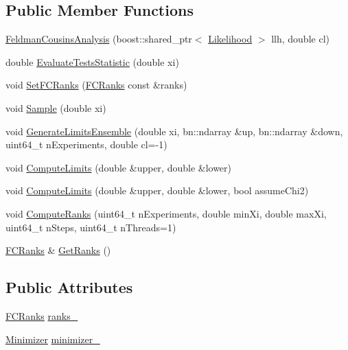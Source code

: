 \subsection*{Public Member Functions}
\begin{DoxyCompactItemize}
\item 
\hyperlink{classFeldmanCousinsAnalysis_a5b2fbad9a24678ba86f0f5b082a5b726}{Feldman\-Cousins\-Analysis} (boost\-::shared\-\_\-ptr$<$ \hyperlink{classLikelihood}{Likelihood} $>$ llh, double cl)
\item 
double \hyperlink{classFeldmanCousinsAnalysis_a090ca9e45d445fed42345d0a71a589bd}{Evaluate\-Tests\-Statistic} (double xi)
\item 
void \hyperlink{classFeldmanCousinsAnalysis_a5761bf4e0cd5968add070215988517ca}{Set\-F\-C\-Ranks} (\hyperlink{classFCRanks}{F\-C\-Ranks} const \&ranks)
\item 
void \hyperlink{classFeldmanCousinsAnalysis_a0f56a30ad2ec38520aa562fbea7f41cf}{Sample} (double xi)
\item 
void \hyperlink{classFeldmanCousinsAnalysis_a2455d8b563e2f243f02c76d61bf10573}{Generate\-Limits\-Ensemble} (double xi, bn\-::ndarray \&up, bn\-::ndarray \&down, uint64\-\_\-t n\-Experiments, double cl=-\/1)
\item 
void \hyperlink{classFeldmanCousinsAnalysis_ab6d8e4b65fa29c30e248f5e022c28dde}{Compute\-Limits} (double \&upper, double \&lower)
\item 
void \hyperlink{classFeldmanCousinsAnalysis_a0ed46c186508934d827e5fefef53be38}{Compute\-Limits} (double \&upper, double \&lower, bool assume\-Chi2)
\item 
void \hyperlink{classFeldmanCousinsAnalysis_a65c0fb42d70bf0a72b36261cde2ac095}{Compute\-Ranks} (uint64\-\_\-t n\-Experiments, double min\-Xi, double max\-Xi, uint64\-\_\-t n\-Steps, uint64\-\_\-t n\-Threads=1)
\item 
\hyperlink{classFCRanks}{F\-C\-Ranks} \& \hyperlink{classFeldmanCousinsAnalysis_a369111f301236a55ef19aeb7ac0d9562}{Get\-Ranks} ()
\end{DoxyCompactItemize}
\subsection*{Public Attributes}
\begin{DoxyCompactItemize}
\item 
\hyperlink{classFCRanks}{F\-C\-Ranks} \hyperlink{classFeldmanCousinsAnalysis_a2a83aefd21bd62772ba9b8ef2a0afe37}{ranks\-\_\-}
\item 
\hyperlink{classMinimizer}{Minimizer} \hyperlink{classFeldmanCousinsAnalysis_a4a16f04a45c379c10b12f76714116226}{minimizer\-\_\-}
\end{DoxyCompactItemize}


